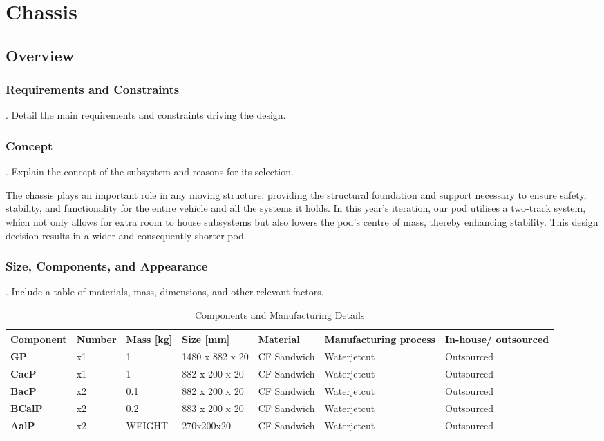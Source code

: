 \documentclass{article}
\begin{document}
\section{Chassis}


\subsection{Overview}
\subsubsection{Requirements and Constraints}
.  Detail the main requirements and constraints driving the design.
\subsubsection{Concept}
.  Explain the concept of the subsystem and reasons for its selection.

The chassis plays an important role in any moving structure, providing the structural foundation and support necessary to ensure safety, stability, and functionality for the entire vehicle and all the systems it holds. In this year's iteration, our pod utilises a two-track system, which not only allows for extra room to house subsystems but also lowers the pod's centre of mass, thereby enhancing stability. This design decision results in a wider and consequently shorter pod.
\subsubsection{Size, Components, and Appearance}
.  Include a table of materials, mass, dimensions, and other relevant factors.
\begin{table}[ht]
\centering

\label{table:components}
\begin{adjustbox}{width=\textwidth,center}
\begin{tabular}{|>{\bfseries}m{2.5cm}|m{1.4cm}|m{1.7cm}|m{2.1cm}|m{2.2cm}|m{2.6cm}|m{2.2cm}|}
\hline
Component & Number & Mass [kg] & Size [mm] & Material & Manufacturing process & In-house/ outsourced \\
\hline
GP & x1 & 1 & 1480 x 882 x 20 & CF Sandwich & Waterjetcut & Outsourced \\
CacP & x1 & 1 & 882 x 200 x 20 & CF Sandwich & Waterjetcut & Outsourced \\
BacP & x2 & 0.1 & 882 x 200 x 20 & CF Sandwich & Waterjetcut & Outsourced \\
BCalP & x2 & 0.2 & 883 x 200 x 20 & CF Sandwich & Waterjetcut & Outsourced \\
AalP & x2 & WEIGHT & 270x200x20 & CF Sandwich & Waterjetcut & Outsourced \\
\hline

\end{tabular}
\end{adjustbox}
\caption{Components and Manufacturing Details}
\end{table}
\end{document}

